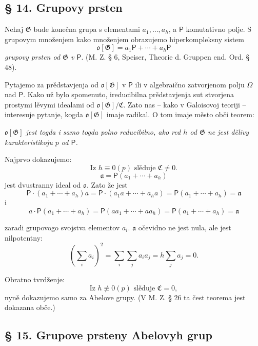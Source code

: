 \documentclass[11pt]{article}
\begin{document}
\subsection*{§ 14. Grupovy prsten}\label{der-gruppenring}

Nehaj \(\mathfrak G\) bude konečna grupa s elementami \(a_1,\ldots,a_h\), a \(\mathsf P\) komutativno polje. S grupovym množenjem kako množenjem obrazujemo hiperkompleksny sistem
\[
\mathfrak o[\mathfrak G]=a_1\mathsf P+\cdots+a_h\mathsf P
\]
\emph{grupovy prsten od \(\mathfrak G\) v \(\mathsf P\)}. (M. Z. § 6, Speiser, Theorie d. Gruppen end. Ord. § 48).

Pytajemo za prědstavjenja od \(\mathfrak o[\mathfrak G]\) v \(\mathsf P\) ili v algebraično zatvorjenom polju \(\Omega\) nad \(\mathsf P\). Kako už bylo spomenuto, ireducibilna prědstavjenja sut stvorjena prostymi lěvymi idealami od \(\mathfrak o[\mathfrak G]/\mathfrak C\). Zato nas -- kako v Galoisovoj teoriji -- interesuje pytanje, kogda \(\mathfrak o[\mathfrak G]\) imaje radikal. O tom imaje město obči teorem:

\begin{center}
\emph{\(\mathfrak o[\mathfrak G]\) jest togda i samo togda polno reducibilno, ako red \(h\) od \(\mathfrak G\) ne jest dělivy karakteristikoju \(p\) od \(\mathsf P\).}
\end{center}

Najprvo dokazujemo:
\[
\text{Iz } h\equiv0(p) \text{ slěduje } \mathfrak C\ne 0.
\]
\[
\mathfrak a=\mathsf P(a_1+\cdots+a_h)
\]
jest dvustranny ideal od \(\mathfrak o\). Zato že jest
\[
\mathsf P\cdot(a_1+\cdots+a_h)a
=\mathsf P\cdot(a_1a+\cdots+a_ha)
=\mathsf P(a_1+\cdots+a_h)=\mathfrak a
\]
i
\[
a\cdot\mathsf P(a_1+\cdots+a_h)
=\mathsf P(aa_1+\cdots+aa_h)
=\mathsf P(a_1+\cdots+a_h)=\mathfrak a
\]

zaradi grupovogo svojstva elementov \(a_i\). \(\mathfrak a\) očevidno ne jest nula, ale jest nilpotentny:
\[
\left(\sum_i a_i\right)^2=\sum_i\sum_j a_i a_j
=h\sum_j a_j=0.
\]

Obratno tvrdženje:
\[
\text{Iz } h\not\equiv0(p) \text{ slěduje } \mathfrak C=0,
\]
nyně dokazujemo samo za Abelove grupy. (V M. Z. § 26 ta čest teorema jest dokazana obče.)

\subsection*{§ 15. Grupove prsteny Abelovyh grup}\label{die-gruppenringe-abelscher-gruppen}
\end{document}
